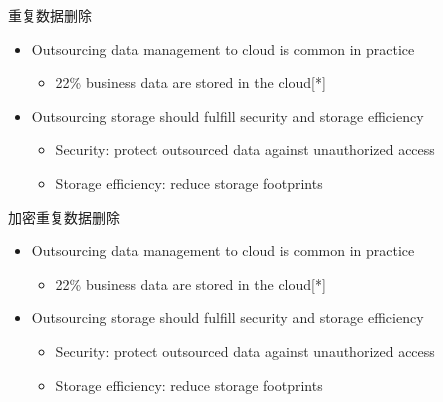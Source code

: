\documentclass{beamer}
\begin{document}
\begin{frame}{重复数据删除}
    \begin{itemize}
        \item Outsourcing data management to cloud is common in practice
              \begin{itemize}
                  \item 22\% business data are stored in the cloud[*]
              \end{itemize}
        \item  Outsourcing storage should fulfill security and storage efficiency
              \begin{itemize}
                  \item  Security: protect outsourced data against unauthorized access
                  \item  Storage efficiency: reduce storage footprints
              \end{itemize}
    \end{itemize}
\end{frame}

\begin{frame}{加密重复数据删除}
    \begin{itemize}
        \item Outsourcing data management to cloud is common in practice
              \begin{itemize}
                  \item 22\% business data are stored in the cloud[*]
              \end{itemize}
        \item  Outsourcing storage should fulfill security and storage efficiency
              \begin{itemize}
                  \item  Security: protect outsourced data against unauthorized access
                  \item  Storage efficiency: reduce storage footprints
              \end{itemize}
    \end{itemize}
\end{frame}
\end{document}
